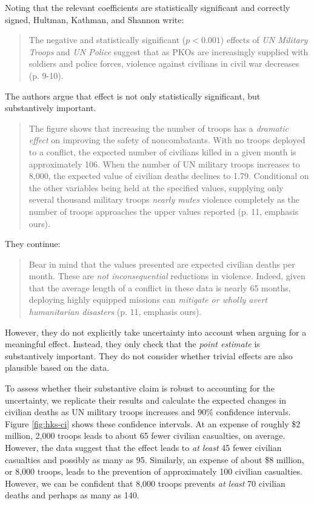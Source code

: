 \documentclass[12pt]{article}
\begin{document}
Noting that the relevant coefficients are statistically significant and correctly signed, Hultman, Kathman, and Shannon write:

\begin{quote}
The negative and statistically significant ($p < 0.001$) effects of \textit{UN Military Troops} and \textit{UN Police} suggest that as PKOs are increasingly supplied with soldiers and police forces, violence against civilians in civil war decreases (p. 9-10).
\end{quote}

The authors argue that effect is not only statistically significant, but substantively important.

\begin{quote}
The figure shows that increasing the number of troops has a \emph{dramatic effect} on improving the safety of noncombatants. With no troops deployed to a conflict, the expected number of civilians killed in a given month is approximately 106. When the number of UN military troops increases to 8,000, the expected value of civilian deaths declines to 1.79. Conditional on the other variables being held at the specified values, supplying only several thousand military troops \emph{nearly mutes} violence completely as the number of troops approaches the upper values reported (p. 11, emphasis ours).
\end{quote}

\noindent They continue:

\begin{quote}
Bear in mind that the values presented are expected civilian deaths per month. These are \emph{not inconsequential} reductions in violence. Indeed, given that the average length of a conflict in these data is nearly 65 months, deploying highly equipped missions can \emph{mitigate or wholly avert humanitarian disasters} (p. 11, emphasis ours).
\end{quote}

However, they do not explicitly take uncertainty into account when arguing for a meaningful effect. Instead, they only check that the \emph{point estimate} is substantively important. They do not consider whether trivial effects are also plausible based on the data.

To assess whether their substantive claim is robust to accounting for the uncertainty, we replicate their results and calculate the expected changes in civilian deaths as UN military troops increases and 90\% confidence intervals. Figure \ref{fig:hks-ci} shows these confidence intervals. At an expense of roughly \$2 million, 2,000 troops leads to about 65 fewer civilian casualties, on average. However, the data suggest that the effect leads to \textit{at least} 45 fewer civilian casualties and possibly as many as 95. Similarly, an expense of about \$8 million, or 8,000 troops, leads to the prevention of approximately 100 civilian casualties. However, we can be confident that 8,000 troops prevents \emph{at least} 70 civilian deaths and perhaps as many as 140. 
\end{document}
